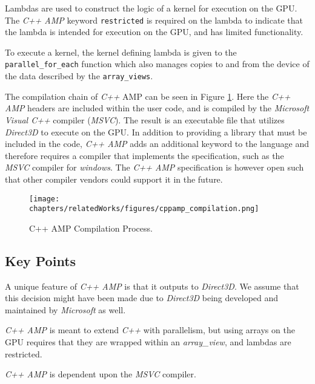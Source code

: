 Lambdas are used to construct the logic of a kernel for execution on the GPU. The \textit{C++ AMP} keyword \texttt{restricted} is required on the lambda to indicate that the lambda is intended for execution on the GPU, and has limited functionality. 

To execute a kernel, the kernel defining lambda is given to the \texttt{parallel\_for\_each} function which also manages copies to and from the device of the data described by the \texttt{array\_views}.

The compilation chain of \textit{C++} AMP can be seen in Figure \ref{fig:cppampCompilation}. Here the \textit{C++ AMP} headers are included within the user code, and is compiled by the \textit{Microsoft Visual C++} compiler (\textit{MSVC}). The result is an executable file that utilizes \textit{Direct3D} to execute on the GPU. In addition to providing a library that must be included in the code, \textit{C++ AMP} adds an additional keyword to the language and therefore requires a compiler that implements the specification, such as the \textit{MSVC} compiler for \textit{windows}. The \textit{C++ AMP} specification is however open such that other compiler vendors could support it in the future.

\begin{figure}[H]
\center
\texttt{[image: chapters/relatedWorks/figures/cppamp\_compilation.png]}
\caption{C++ AMP Compilation Process.}
\label{fig:cppampCompilation}
\end{figure}

\subsection{Key Points}
A unique feature of \textit{C++ AMP} is that it outputs to \textit{Direct3D}. We assume that this decision might have been made due to \textit{Direct3D} being developed and maintained by \textit{Microsoft} as well.

\textit{C++ AMP} is meant to extend \textit{C++} with parallelism, but using arrays on the GPU requires that they are wrapped within an \textit{array\_view}, and lambdas are restricted. 

\textit{C++ AMP} is dependent upon the \textit{MSVC} compiler.
